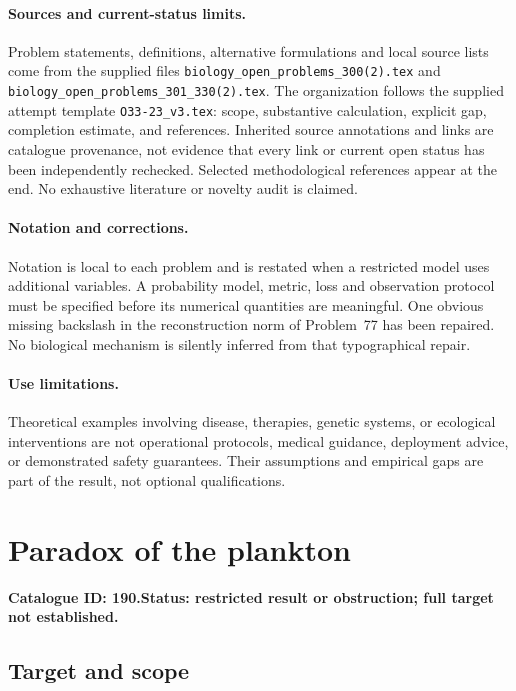 \documentclass[11pt]{article}
\begin{document}
\paragraph{Sources and current-status limits.}
Problem statements, definitions, alternative formulations and local source lists
come from the supplied files
\texttt{biology\_open\_problems\_300(2).tex} and
\texttt{biology\_open\_problems\_301\_330(2).tex}.
The organization follows the supplied attempt template
\texttt{O33-23\_v3.tex}: scope, substantive calculation, explicit gap,
completion estimate, and references. Inherited source annotations and links are
catalogue provenance, not evidence that every link or current open status has
been independently rechecked. Selected methodological references appear at the
end. No exhaustive literature or novelty audit is claimed.

\paragraph{Notation and corrections.}
Notation is local to each problem and is restated when a restricted model uses
additional variables. A probability model, metric, loss and observation protocol
must be specified before its numerical quantities are meaningful. One obvious
missing backslash in the reconstruction norm of Problem~77 has been repaired.
No biological mechanism is silently inferred from that typographical repair.

\paragraph{Use limitations.}
Theoretical examples involving disease, therapies, genetic systems, or ecological
interventions are not operational protocols, medical guidance, deployment advice,
or demonstrated safety guarantees. Their assumptions and empirical gaps are part
of the result, not optional qualifications.

\setcounter{section}{189}
\section{Paradox of the plankton}
\label{prob:190}
\noindent\textbf{Catalogue ID: 190.}\quad \textbf{Status: restricted result or obstruction; full target not established.}
\subsection{Target and scope}
\end{document}
